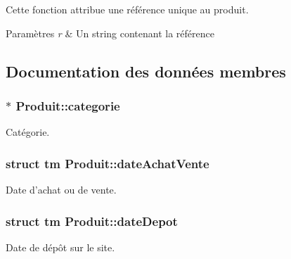 Cette fonction attribue une référence unique au produit. 


\begin{DoxyParams}{Paramètres}
{\em r} & Un string contenant la référence \\
\hline
\end{DoxyParams}


\subsection{Documentation des données membres}
\hypertarget{class_produit_a27756eb9e95c2a37dad2f73c3c3fa2e3}{
\subsubsection[{categorie}]{$\ast$ Produit\-::categorie\hspace{0.3cm}{\ttfamily [protected]}}}\label{class_produit_a27756eb9e95c2a37dad2f73c3c3fa2e3}


Catégorie. 

\hypertarget{class_produit_af97688d1cf1ed5b59b248f688b42bc47}{
\subsubsection[{date\-Achat\-Vente}]{\setlength{\rightskip}{0pt plus 5cm}struct tm Produit\-::date\-Achat\-Vente\hspace{0.3cm}{\ttfamily [protected]}}}\label{class_produit_af97688d1cf1ed5b59b248f688b42bc47}


Date d'achat ou de vente. 

\hypertarget{class_produit_ad1e7e307209f7ef6ad7cf407801fb5e6}{
\subsubsection[{date\-Depot}]{\setlength{\rightskip}{0pt plus 5cm}struct tm Produit\-::date\-Depot\hspace{0.3cm}{\ttfamily [protected]}}}\label{class_produit_ad1e7e307209f7ef6ad7cf407801fb5e6}


Date de dépôt sur le site. 

